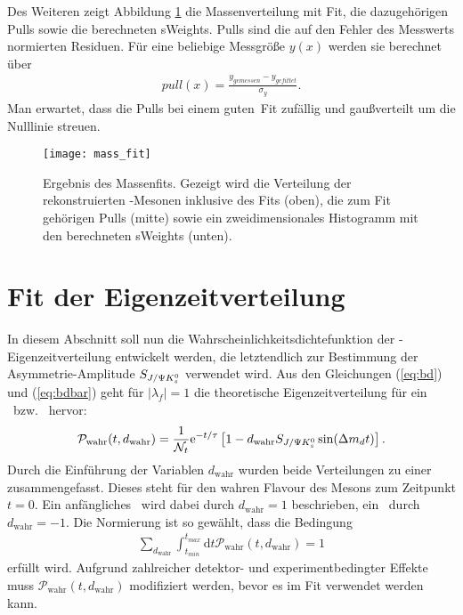 Des Weiteren zeigt Abbildung \ref{fig:fit_masse} die Massenverteilung mit Fit, die dazugehörigen Pulls sowie die berechneten sWeights. Pulls sind die auf den Fehler des Messwerts normierten Residuen. Für eine beliebige Messgröße $y(x)$ werden sie berechnet über
\begin{align}
pull(x) = \frac{y_{gemessen}-y_{gefittet}}{\sigma_y}.
\end{align}
Man erwartet, dass die Pulls bei einem \glqq guten\grqq\ Fit zufällig und gaußverteilt um die Nulllinie streuen.

\begin{figure}[hptb]
\centering
\texttt{[image: mass\_fit]}
\caption{Ergebnis des Massenfits. Gezeigt wird die Verteilung der rekonstruierten \Bd-Mesonen inklusive des Fits (oben), die zum Fit gehörigen Pulls (mitte) sowie ein zweidimensionales Histogramm mit den berechneten sWeights (unten).}
\label{fig:fit_masse}
\end{figure}


\section{Fit der Eigenzeitverteilung} \label{kap:eigenzeitverteilung}
In diesem Abschnitt soll nun die Wahrscheinlichkeitsdichtefunktion der \Bd-Ei\-gen\-zeit\-ver\-tei\-lung entwickelt werden, die letztendlich zur Bestimmung der Asymmetrie-Amplitude $S_{J/\Psi K_s^0}$ verwendet wird. Aus den Gleichungen (\ref{eq:bd}) und (\ref{eq:bdbar}) geht für $|\lambda_f|=1$ die theoretische Eigenzeitverteilung für ein \Bd\ bzw. \Bdbar\ hervor:
\begin{align}
\mathcal{P}_{\text{wahr}}(t, d_{\text{wahr}}) = \frac{1}{\mathcal{N}_t}\mathrm{e}^{-t/\tau}\left[1-d_{\text{wahr}}S_{J/\Psi K_s^0}\sin(\Delta m_d t)\right].
\end{align}
Durch die Einführung der Variablen $d_{\text{wahr}}$ wurden beide Verteilungen zu einer zusammengefasst. Dieses steht für den wahren Flavour des Mesons zum Zeitpunkt $t=0$. Ein anfängliches \Bd\ wird dabei durch $d_{\text{wahr}}=1$ beschrieben, ein \Bdbar\ durch $d_{\text{wahr}}=-1$. Die Normierung ist so gewählt, dass die Bedingung
\begin{align}
\sum_{d_{\text{wahr}}}\int_{t_{min}}^{t_{max}}\mathrm{d}t\mathcal{P}_{\text{wahr}}(t, d_{\text{wahr}}) = 1
\end{align}
erfüllt wird. Aufgrund zahlreicher detektor- und experimentbedingter Effekte muss $\mathcal{P}_{\text{wahr}}(t, d_{\text{wahr}})$ modifiziert werden, bevor es im Fit verwendet werden kann.

